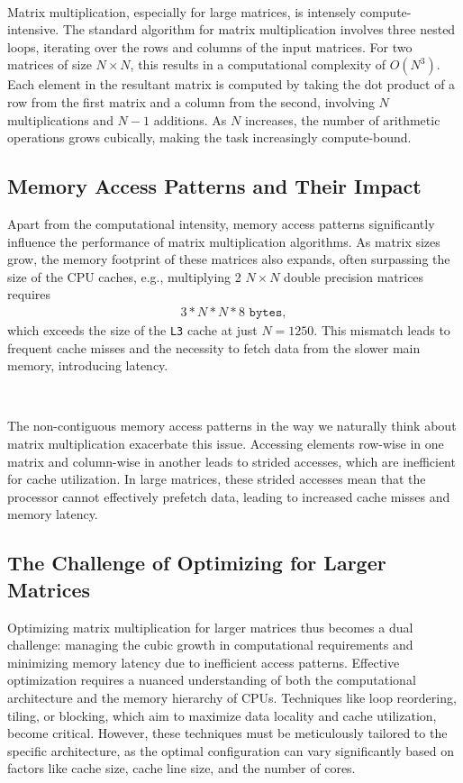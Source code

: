 \documentclass{article}
\begin{document}
\

\noindent Matrix multiplication, especially for large matrices, is intensely compute-intensive. 
The standard algorithm for matrix multiplication involves three nested loops, 
iterating over the rows and columns of the input matrices. 
For two matrices of size \( N \times N \), this results in a computational complexity of 
\( O(N^3) \). Each element in the resultant matrix is computed by taking the dot product of 
a row from the first matrix and a column from the second, involving \( N \) 
multiplications and \( N-1 \) additions. As \( N \) increases, the number of 
arithmetic operations grows cubically, making the task increasingly compute-bound.

\subsection{Memory Access Patterns and Their Impact}

Apart from the computational intensity, memory access patterns significantly 
influence the performance of matrix multiplication algorithms. As matrix sizes grow, 
the memory footprint of these matrices also expands, often surpassing the size of the CPU 
caches, e.g., multiplying 2 $N \times N$ double precision matrices requires
\begin{align*}
    3 * N * N * 8 \texttt{ bytes},
\end{align*}
which exceeds the size of the \texttt{L3} cache at just $N = 1250$.
This mismatch leads to frequent cache misses and the necessity to fetch 
data from the slower main memory, introducing latency.

\

\noindent The non-contiguous memory access patterns in the way we naturally think about matrix multiplication exacerbate this issue. 
Accessing elements row-wise in one matrix and column-wise in another leads to strided accesses, 
which are inefficient for cache utilization. In large matrices, these strided accesses mean that 
the processor cannot effectively prefetch data, leading to increased cache misses and memory 
latency.

\subsection{The Challenge of Optimizing for Larger Matrices}

Optimizing matrix multiplication for larger matrices thus becomes a dual challenge: managing the cubic growth in computational requirements and minimizing memory latency due to inefficient access patterns. Effective optimization requires a nuanced understanding of both the computational architecture and the memory hierarchy of CPUs. Techniques like loop reordering, tiling, or blocking, which aim to maximize data locality and cache utilization, become critical. However, these techniques must be meticulously tailored to the specific architecture, as the optimal configuration can vary significantly based on factors like cache size, cache line size, and the number of cores.
\end{document}
